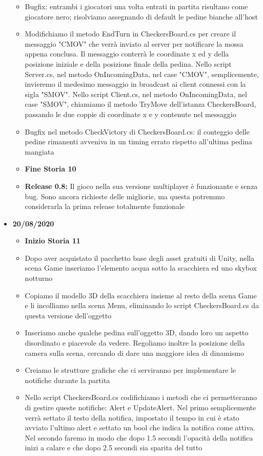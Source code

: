 \documentclass[12pt]{article}
\begin{document}
\begin{itemize}
\begin{itemize}
	\item Bugfix: entrambi i giocatori una volta entrati in partita risultano come giocatore nero; risolviamo assegnando di default le pedine bianche all'host
	\item Modifichiamo il metodo EndTurn in CheckersBoard.cs per creare il messaggio "CMOV" che verrà inviato al server per notificare la mossa appena conclusa. Il messaggio conterrà le coordinate x ed y della posizione iniziale e della posizione finale della pedina. Nello script Server.cs, nel metodo OnIncomingData, nel case "CMOV", semplicemente, invieremo il medesimo messaggio in broadcast ai client connessi con la sigla "SMOV". Nello script Client.cs, nel metodo OnIncomingData, nel case "SMOV", chiamiamo il metodo TryMove dell'istanza CheckersBoard, passando le due coppie di coordinate x e y contenute nel messaggio
	\item Bugfix nel metodo CheckVictory di CheckersBoard.cs: il conteggio delle pedine rimanenti avveniva in un timing errato rispetto all'ultima pedina mangiata
	\item \textbf{Fine Storia 10}
	\item \textbf{Release 0.8:} Il gioco nella sua versione multiplayer è funzionante e senza bug. Sono ancora richieste delle migliorie, ma questa potremmo considerarla la prima release totalmente funzionale
	\end{itemize}
\item \textbf{20/08/2020}
	\begin{itemize}
	\item \textbf{Inizio Storia 11}
	\item Dopo aver acquistato il pacchetto base degli asset gratuiti di Unity, nella scena Game inseriamo l'elemento acqua sotto la scacchiera ed uno skybox notturno
	\item Copiamo il modello 3D della scacchiera insieme al resto della scena Game e li incolliamo nella scena Menu, eliminando lo script CheckersBoard.cs da questa versione dell'oggetto
	\item Inseriamo anche qualche pedina sull'oggetto 3D, dando loro un aspetto disordinato e piacevole da vedere. Regoliamo inoltre la posizione della camera sulla scena, cercando di dare una maggiore idea di dinamismo
	\item Creiamo le strutture grafiche che ci serviranno per implementare le notifiche durante la partita
	\item Nello script CheckersBoard.cs codifichiamo i metodi che ci permetteranno di gestire queste notifiche: Alert e UpdateAlert. Nel primo semplicemente verrà settato il testo della notifica, impostato il tempo in cui è stato avviato l'ultimo alert e settato un bool che indica la notifica come attiva. Nel secondo faremo in modo che dopo 1.5 secondi l'opacità della notifica inizi a calare e che dopo 2.5 secondi sia sparita del tutto

\end{itemize}
\end{itemize}
\end{document}
